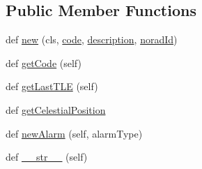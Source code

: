\subsection*{Public Member Functions}
\begin{DoxyCompactItemize}
\item 
def \hyperlink{class_ground_segment_1_1models_1_1_satellite_1_1_satellite_a31da88247812f3de8ee84b91b50f27b7}{new} (cls, \hyperlink{class_ground_segment_1_1models_1_1_satellite_1_1_satellite_ae4a43a1ee941bff4914f4fed1e2775a1}{code}, \hyperlink{class_ground_segment_1_1models_1_1_satellite_1_1_satellite_a076215a5d0896cf97edbf312c7605000}{description}, \hyperlink{class_ground_segment_1_1models_1_1_satellite_1_1_satellite_a7962e5b81ff68f4fdedb33ce54bd4368}{norad\+Id})
\item 
def \hyperlink{class_ground_segment_1_1models_1_1_satellite_1_1_satellite_a514073889905f270022336e51caf420e}{get\+Code} (self)
\item 
def \hyperlink{class_ground_segment_1_1models_1_1_satellite_1_1_satellite_ae2cd61983a5d3797c175b719ced66dd5}{get\+Last\+T\+L\+E} (self)
\item 
def \hyperlink{class_ground_segment_1_1models_1_1_satellite_1_1_satellite_ae29d261034411899685e71315d36411a}{get\+Celestial\+Position}
\item 
def \hyperlink{class_ground_segment_1_1models_1_1_satellite_1_1_satellite_aeaa5108842200cd7d39e9fc0546d09a5}{new\+Alarm} (self, alarm\+Type)
\item 
def \hyperlink{class_ground_segment_1_1models_1_1_satellite_1_1_satellite_a0256a218df8e5fe93b8d2189e5c55849}{\+\_\+\+\_\+str\+\_\+\+\_\+} (self)
\end{DoxyCompactItemize}
